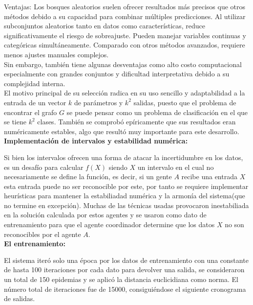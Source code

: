     Ventajas: Los bosques aleatorios suelen ofrecer resultados más precisos que otros métodos debido a su capacidad para combinar múltiples predicciones. Al utilizar 
    subconjuntos aleatorios tanto en datos como características, reduce significativamente el riesgo de sobreajuste. Pueden manejar variables continuas y categóricas 
    simultáneamente. Comparado con otros métodos avanzados, requiere menos ajustes manuales complejos. \\
    
    Sin embargo, también tiene algunas desventajas como alto costo computacional especialmente con grandes conjuntos y dificultad interpretativa debido a su 
    complejidad interna. \\

    El motivo principal de su selección radica en su uso sencillo y adaptabilidad a la entrada de un vector $k$ de parámetros y $k^2$ salidas, puesto que el problema 
    de encontrar el grafo $G$ se puede pensar como un problema de clasificación en el que se tiene $k^2$ clases. También se comprobó epíricamente que sus resultados
    eran numéricamente estables, algo que resultó muy importante para este desarrollo. \\


    \textbf{Implementación de intervalos y estabilidad numérica:}

    Si bien los intervalos ofrecen una forma de atacar la incertidumbre en los datos, es un desafío para calcular $f(X)$ siendo $X$ un intervalo en el cual no 
    necesariamente se define la función, es decir, si un gente $A$ recibe una entrada $X$ esta entrada puede no ser reconocible por este, por tanto se requiere 
    implementar heurísticas para mantener la estabiliadad numérica y la armonía del sistema(que no termine en excepción). Muchas de las técnicas usadas provocaron 
    inestabiliada en la solución calculada por estos agentes y se usaron como dato de entrenamiento para que el agente coordinador determine que los datos $X$ no 
    son reconocibles por el agente $A$. \\

    \textbf{El entrenamiento:}

    El sistema iteró solo una época por los datos de entrenamiento con una constante de hasta 100 iteraciones por cada dato para devolver una salida, se consideraron
    un total de 150 epidemias y se aplicó la distancia euclicidiana como norma. El número total de iteraciones fue de 15000, consiguiéndose el siguiente cronograma de salidas.

